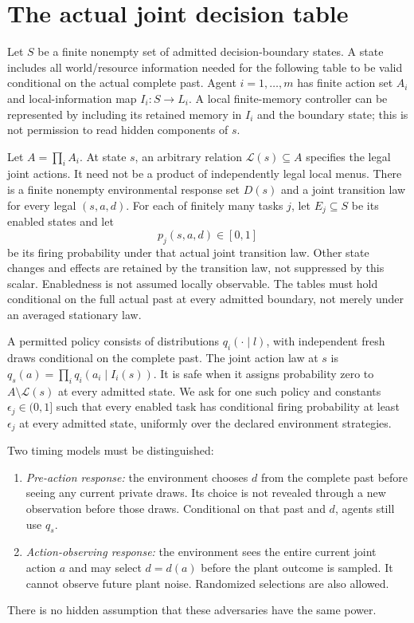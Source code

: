 \documentclass[11pt]{article}
\begin{document}
\section{The actual joint decision table}
Let $S$ be a finite nonempty set of admitted decision-boundary states. A state includes all world/resource information needed for the following table to be valid conditional on the actual complete past. Agent $i=1,\ldots,m$ has finite action set $A_i$ and local-information map $I_i:S\to L_i$. A local finite-memory controller can be represented by including its retained memory in $I_i$ and the boundary state; this is not permission to read hidden components of $s$.

Let $A=\prod_i A_i$. At state $s$, an arbitrary relation $\mathcal L(s)\subseteq A$ specifies the legal joint actions. It need not be a product of independently legal local menus. There is a finite nonempty environmental response set $D(s)$ and a joint transition law for every legal $(s,a,d)$. For each of finitely many tasks $j$, let $E_j\subseteq S$ be its enabled states and let
\[
 p_j(s,a,d)\in[0,1]
\]
be its firing probability under that actual joint transition law. Other state changes and effects are retained by the transition law, not suppressed by this scalar. Enabledness is not assumed locally observable. The tables must hold conditional on the full actual past at every admitted boundary, not merely under an averaged stationary law.

A permitted policy consists of distributions $q_i(\cdot\mid l)$, with independent fresh draws conditional on the complete past. The joint action law at $s$ is $q_s(a)=\prod_iq_i(a_i\mid I_i(s))$. It is safe when it assigns probability zero to $A\setminus\mathcal L(s)$ at every admitted state. We ask for one such policy and constants $\epsilon_j\in(0,1]$ such that every enabled task has conditional firing probability at least $\epsilon_j$ at every admitted state, uniformly over the declared environment strategies.

Two timing models must be distinguished:
\begin{enumerate}
\item \emph{Pre-action response:} the environment chooses $d$ from the complete past before seeing any current private draws. Its choice is not revealed through a new observation before those draws. Conditional on that past and $d$, agents still use $q_s$.
\item \emph{Action-observing response:} the environment sees the entire current joint action $a$ and may select $d=d(a)$ before the plant outcome is sampled. It cannot observe future plant noise. Randomized selections are also allowed.
\end{enumerate}
There is no hidden assumption that these adversaries have the same power.
\end{document}
